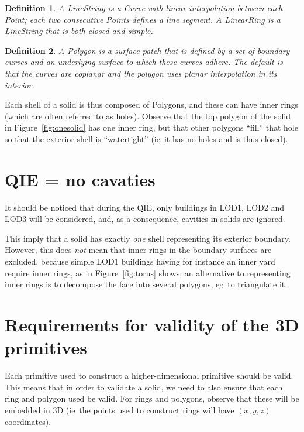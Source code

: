 \documentclass[a4paper,parskip=half,11pt]{scrartcl}
\newcommand{\ie}{ie}
\newcommand{\eg}{eg}
\newtheorem{definition}{Definition}
\begin{document}
\begin{definition}
A LineString is a Curve with linear interpolation between each Point; each two consecutive Points defines a line segment.
A LinearRing is a LineString that is both closed and simple.
\end{definition}
\begin{definition}
  A Polygon is a surface patch that is defined by a set of boundary curves and an underlying surface to which these curves adhere. 
  The default is that the curves are coplanar and the polygon uses planar interpolation in its interior.
\end{definition}

Each shell of a solid is thus composed of Polygons, and these can have inner rings (which are often referred to as holes).
Observe that the top polygon of the solid in Figure~\ref{fig:onesolid} has one inner ring, but that other polygons ``fill'' that hole so that the exterior shell is ``watertight'' (\ie\ it has no holes and is thus closed).


%
\section{QIE = no cavaties}

It should be noticed that during the QIE, only buildings in LOD1, LOD2 and LOD3 will be considered, and, as a consequence, cavities in solids are ignored.

This imply that a solid has exactly \emph{one} shell representing its exterior boundary.
However, this does \emph{not} mean that inner rings in the boundary surfaces are excluded, because simple LOD1 buildings having for instance an inner yard require inner rings, as in Figure~\ref{fig:torus} shows; an alternative to representing inner rings is to decompose the face into several polygons, \eg\ to triangulate it.


%
\section{Requirements for validity of the 3D primitives}

Each primitive used to construct a higher-dimensional primitive should be valid.
This means that in order to validate a solid, we need to also ensure that each ring and polygon used be valid.
For rings and polygons, observe that these will be embedded in 3D (\ie\ the points used to construct rings will have $(x,y,z)$ coordinates).
\end{document}
